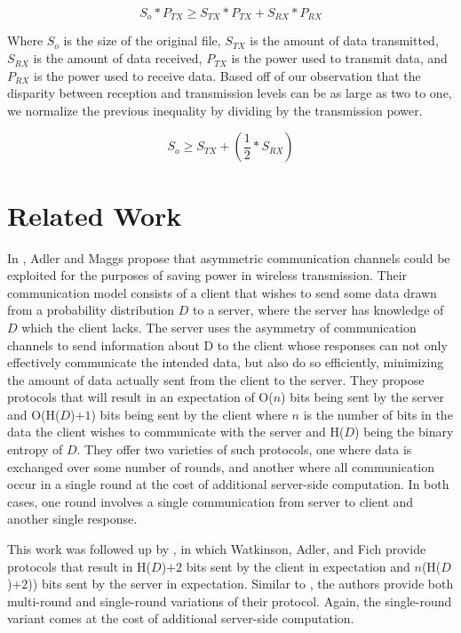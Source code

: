 \documentclass[conference]{IEEEtran}
\begin{document}
\begin{equation}
S_o * P_{TX} \geq S_{TX} * P_{TX} + S_{RX} * P_{RX}
\end{equation}

Where $S_o$ is the size of the original file, $S_{TX}$ is the amount of data
transmitted, $S_{RX}$ is the amount of data received, $P_{TX}$ is the power 
used to transmit data, and $P_{RX}$ is the power used to receive data.  Based
off of our observation that the disparity between reception and 
transmission levels can be as large as two to one, we normalize the
previous inequality by dividing by the transmission power.

\begin{equation}
S_o \geq S_{TX} + (\frac{1}{2} * S_{RX})
\end{equation}

\section{Related Work}

In \cite{Adler98}, Adler and Maggs propose that asymmetric
communication channels could be exploited for the purposes of saving
power in wireless transmission.  Their communication model consists of
a client that wishes to send some data drawn from a probability
distribution $D$ to a server, where the server has knowledge of $D$
which the client lacks.  The server uses the asymmetry of
communication channels to send information about D to the client whose
responses can not only effectively communicate the intended data, but
also do so efficiently, minimizing the amount of data actually sent
from the client to the server. They propose protocols that will result
in an expectation of O($n$) bits being sent by the server and
O(H($D$)$ + 1$) bits being sent by the client where $n$ is the number
of bits in the data the client wishes to communicate with the server
and H($D$) being the binary entropy of $D$.  They offer two varieties
of such protocols, one where data is exchanged over some number of
rounds, and another where all communication occur in a single round at
the cost of additional server-side computation.  In both cases, one
round involves a single communication from server to client and
another single response.

This work was followed up by \cite{Watkinson01}, in which Watkinson,
Adler, and Fich provide protocols that result in H($D$)$ + 2$ bits
sent by the client in expectation and $n$(H($D$)$ + 2$)) bits sent by
the server in expectation.  Similar to \cite{Adler98}, the authors
provide both multi-round and single-round variations of their
protocol.  Again, the single-round variant comes at the cost of
additional server-side computation.
\end{document}
